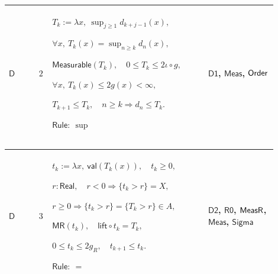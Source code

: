 \documentclass[12pt,reqno]{amsart}
\theoremstyle{blueplain}
\numberwithin{equation}{section}
\begin{document}
{\scriptsize \setlength{\parskip}{0pt}\nointerlineskip
\noindent 
\begin{tabular}{|@{}>{\centering\arraybackslash}m{0.10658\linewidth}|>{\centering\arraybackslash}m{0.03553\linewidth}|>{\centering\arraybackslash}m{0.52105\linewidth}|>{\centering\arraybackslash}m{0.23684\linewidth}|}
\hline
\hypertarget{dct:D2}{$\displaystyle \mathsf{D}$} & $\displaystyle 2$ & $%
\displaystyle T_k:=\lambda x,\ \sup_{j\ge1}d_{k+j-1}(x),$\par$\displaystyle %
\forall x,\ T_k(x)=\sup_{n\ge k}d_n(x),$\par$\displaystyle \mathsf{Measurable%
}(T_k),\quad0\le T_k\le2\iota\circ g,$\par$\displaystyle \forall x,\
T_k(x)\le2g(x)<\infty,$\par$\displaystyle T_{k+1}\le T_k,\quad n\ge
k\Rightarrow d_n\le T_k.$\par$\displaystyle \mathsf{Rule}:\ \sup$ & 
\hyperlink{dct:D1}{$\displaystyle \mathsf{D1}$}, \hyperlink{lem:Meas}{$%
\displaystyle \mathsf{Meas}$}, \hyperlink{ax:Order}{$\displaystyle \mathsf{%
Order}$} \\ \hline
\end{tabular}%
}

{\scriptsize \setlength{\parskip}{0pt}\nointerlineskip
\noindent 
\begin{tabular}{|@{}>{\centering\arraybackslash}m{0.10658\linewidth}|>{\centering\arraybackslash}m{0.03553\linewidth}|>{\centering\arraybackslash}m{0.52105\linewidth}|>{\centering\arraybackslash}m{0.23684\linewidth}|}
\hline
\hypertarget{dct:D3}{$\displaystyle \mathsf{D}$} & $\displaystyle 3$ & $%
\displaystyle t_k:=\lambda x,\ \mathsf{val}(T_k(x)),\quad t_k\ge0,$\par$%
\displaystyle r:\mathsf{Real},\quad r<0\Rightarrow\{t_k>r\}=X,$\par$%
\displaystyle r\ge0\Rightarrow\{t_k>r\}=\{T_k>r\}\in A,$\par$\displaystyle 
\mathsf{MR}(t_k),\quad\mathsf{lift}\circ t_k=T_k,$\par$\displaystyle 0\le
t_k\le2g_R,\quad t_{k+1}\le t_k.$\par$\displaystyle \mathsf{Rule}:\ =$ & 
\hyperlink{dct:D2}{$\displaystyle \mathsf{D2}$}, \hyperlink{dct:R0}{$%
\displaystyle \mathsf{R0}$}, \hyperlink{dctdef:MeasR}{$\displaystyle \mathsf{%
MeasR}$}, \hyperlink{def:Meas}{$\displaystyle \mathsf{Meas}$}, \hyperlink{ax:Sigma}%
{$\displaystyle \mathsf{Sigma}$} \\ \hline
\end{tabular}%
}
\end{document}
